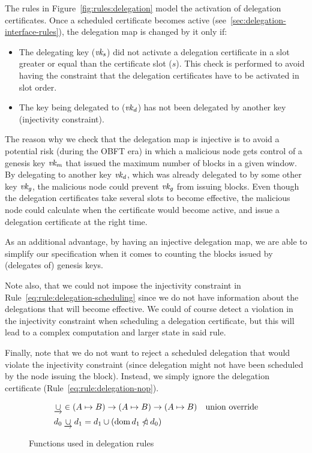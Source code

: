 \clearpage

The rules in Figure~\ref{fig:rules:delegation} model the activation of
delegation certificates. Once a scheduled certificate becomes active
(see~\cref{sec:delegation-interface-rules}), the delegation map is changed by
it only if:
\begin{itemize}
\item The delegating key ($\mathit{vk_s}$) did not activate a delegation
  certificate in a slot greater or equal than the certificate slot ($s$). This
  check is performed to avoid having the constraint that the delegation
  certificates have to be activated in slot order.
\item The key being delegated to ($\mathit{vk_d}$) has not been delegated by
  another key (injectivity constraint).
\end{itemize}
The reason why we check that the delegation map is injective is to avoid a
potential risk (during the OBFT era) in which a malicious node gets control of
a genesis key $\mathit{vk_m}$ that issued the maximum number of blocks in a given
window. By delegating to another key $\mathit{vk_d}$, which was already delegated to
by some other key $\mathit{vk_g}$, the malicious node could prevent $\mathit{vk_g}$
from issuing blocks. Even though the delegation certificates take several slots
to become effective, the malicious node could calculate when the certificate
would become active, and issue a delegation certificate at the right time.

As an additional advantage, by having an injective delegation map, we are able
to simplify our specification when it comes to counting the blocks issued by
(delegates of) genesis keys.

Note also, that we could not impose the injectivity constraint in
Rule~\ref{eq:rule:delegation-scheduling} since we do not have information about
the delegations that will become effective. We could of course detect a
violation in the injectivity constraint when scheduling a delegation
certificate, but this will lead to a complex computation and larger state in
said rule.

Finally, note that we do not want to reject a scheduled delegation that would
violate the injectivity constraint (since delegation might not have been
scheduled by the node issuing the block). Instead, we simply ignore the
delegation certificate (Rule~\ref{eq:rule:delegation-nop}).

\begin{figure}[htb]
  \begin{align*}
    & \mathbin{\underrightarrow\cup} \in (A \mapsto B) \to (A \mapsto B) \to (A \mapsto B)
    & \text{union override}\\
    & d_0 \mathbin{\underrightarrow\cup} d_1 = d_1 \cup (\operatorname{dom} d_1 \mathbin{\slashed{\lhd}} d_0)
  \end{align*}
  \caption{Functions used in delegation rules}
  \label{fig:funcs:delegation}
\end{figure}

